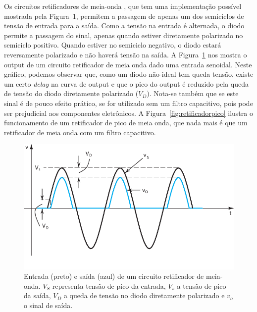 \documentclass[12pt,a4paper]{article}
\begin{document}
Os circuitos retificadores de meia-onda , que tem uma implementação possível mostrada pela Figura~1, permitem a passagem de apenas um dos semiciclos de tensão de entrada para a saída. Como a tensão na entrada é alternada, o diodo permite a passagem do sinal, apenas quando estiver diretamente polarizado no semiciclo positivo. Quando estiver no semiciclo negativo, o diodo estará reversamente polarizado e não haverá tensão na saída. A Figura~\ref{fig:meiaonda} nos mostra o output de um circuito retificador de meia onda dado uma entrada senoidal. Neste gráfico, podemos observar que, como um diodo não-ideal tem queda tensão, existe um certo \emph{delay} na curva de output e que o pico do output é reduzido pela queda de tensão do diodo diretamente polarizado ($V_{D}$). Nota-se também que se este sinal é de pouco efeito prático, se for utilizado sem um filtro capacitivo, pois pode ser prejudicial aos componentes eletrônicos. A Figura~\ref{fig:retificadorpico} ilustra o funcionamento de um retificador de pico de meia onda, que nada mais é que um retificador de meia onda com um filtro capacitivo.
\begin{figure}[htpb]
  \centering
  \includegraphics[width=0.8\linewidth]{./meiaonda.pdf}
  \caption{Entrada (preto) e saída (azul) de um circuito retificador de meia-onda. $V_S$ representa tensão de pico da entrada, $V_s$ a tensão de pico da saída, $V_D$ a queda de tensão no diodo diretamente polarizado e $v_o$ o sinal de saída.}
  \label{fig:meiaonda}
\end{figure}
\end{document}
